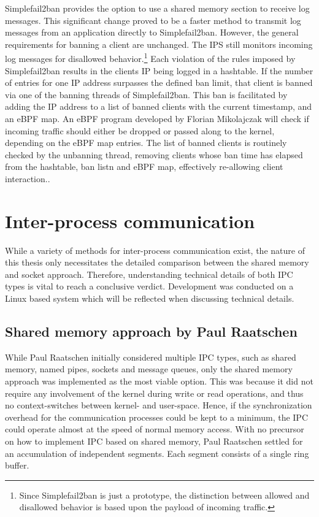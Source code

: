 Simplefail2ban provides the option to use a shared memory section to receive log messages.
This significant change proved to be a faster method to transmit log messages from an application directly to Simplefail2ban.
However, the general requirements for banning a client are unchanged.
The \ac{IPS} still monitors incoming log messages for disallowed behavior.\footnote{Since Simplefail2ban is just a prototype, the distinction between allowed and disallowed behavior is based upon the payload of incoming traffic.}
Each violation of the rules imposed by Simplefail2ban results in the clients \ac{IP} being logged in a hashtable.
If the number of entries for one \ac{IP} address surpasses the defined ban limit, that client is banned via one of the banning threads of Simplefail2ban.
This ban is facilitated by adding the \ac{IP} address to a list of banned clients with the current timestamp, and an \ac{eBPF} map.
An \ac{eBPF} program developed by Florian Mikolajczak will check if incoming traffic should either be dropped or passed along to the kernel, depending on the \ac{eBPF} map entries\cite{mikolajczak:ebpf}.
The list of banned clients is routinely checked by the unbanning thread, removing clients whose ban time has elapsed from the hashtable, ban listn and \ac{eBPF} map, effectively re-allowing client interaction.\cite{raatschen:ipc}.

\section{Inter-process communication}
While a variety of methods for inter-process communication exist, the nature of this thesis only necessitates the detailed comparison between the shared memory and socket approach.
Therefore, understanding technical details of both \ac{IPC} types is vital to reach a conclusive verdict.
Development was conducted on a Linux based system which will be reflected when discussing technical details.

\subsection{Shared memory approach by Paul Raatschen}
While Paul Raatschen initially considered multiple \ac{IPC} types, such as shared memory, named pipes, sockets and message queues, only the shared memory approach was implemented as the most viable option.
This was because it did not require any involvement of the kernel during write or read operations, and thus no context-switches between kernel- and user-space.
Hence, if the synchronization overhead for the communication processes could be kept to a minimum, the \ac{IPC} could operate almost at the speed of normal memory access.
With no precursor on how to implement \ac{IPC} based on shared memory, Paul Raatschen settled for an accumulation of independent segments.
Each segment consists of a single ring buffer.\cite{raatschen:ipc}

